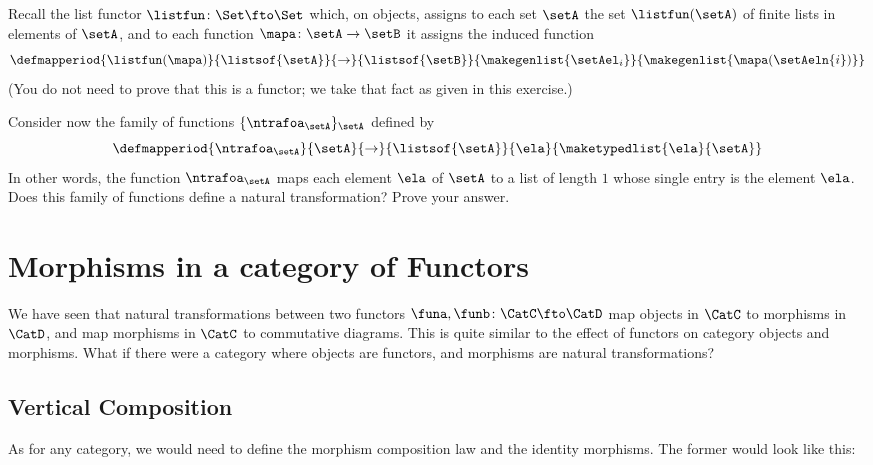 \begin{gradedexercise}

    Recall the list functor $\listfun \colon \Set \fto \Set$ which, on objects, assigns to each set $\setA$ the set $\listfun(\setA)$ of finite lists in elements of $\setA$, and to each function $\mapa \colon \setA \to \setB$ it assigns the induced function
    \begin{equation}\label{eq:list-functor-on-functions}
        \defmapperiod{
            \listfun(\mapa)
        }{
            \listsof{\setA}
        }{
            \to
        }{
            \listsof{\setB}
        }{
            \makegenlist{ \setAel_i }
        }{
            \makegenlist{ \mapa(\setAeln{i}) }
        }
    \end{equation}
    (You do not need to prove that this is a functor; we take that fact as given in this exercise.)

    Consider now the family of functions $\{ \ntrafoa_\setA \}_\setA$ defined by
    \begin{equation}
        \defmapperiod{
            \ntrafoa_\setA
        }{
            \setA
        }{
            \to
        }{
            \listsof{\setA}
        }{
            \ela
        }{
            \maketypedlist{\ela}{\setA}
        }
    \end{equation}
    In other words, the function $\ntrafoa_\setA$ maps each element $\ela$ of $\setA$ to a list of length $1$ whose single entry is the element $\ela$.
    Does this family of functions define a natural transformation? Prove your answer.
\end{gradedexercise}


\section{Morphisms in a category of Functors}
We have seen that natural transformations between two functors $\funa, \funb \colon \CatC \fto \CatD$ map objects in $\CatC$ to morphisms in $\CatD$, and map morphisms in $\CatC$ to commutative diagrams.
This is quite similar to the effect of functors on category objects and morphisms.
What if there were a category where objects are functors, and morphisms are natural transformations?

\subsection{Vertical Composition}
As for any category, we would need to define the morphism composition law and the identity morphisms.
The former would look like this:


